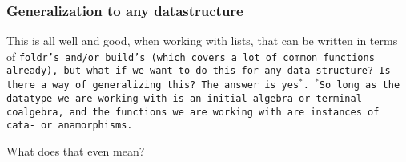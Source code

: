 \subsubsection{Generalization to any datastructure}
This is all well and good, when working with lists, that can be written in terms of \tt{foldr}'s and/or \tt{build}'s (which covers a lot of common functions already), but what if we want to do this for any data structure? Is there a way of generalizing this?
The answer is yes$^*$. $^*$So long as the datatype we are working with is an initial algebra or terminal coalgebra, and the functions we are working with are instances of cata- or anamorphisms.

What does that even mean?